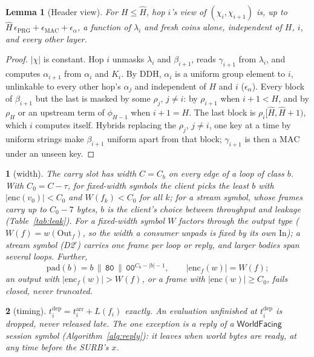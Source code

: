 \documentclass[journal]{IEEEtran}
\newtheorem{lemma}{Lemma}
\newcommand{\namedhead}{}
\newtheorem*{namedenv}{\namedhead}
\newenvironment{lawL}[2]{\renewcommand{\namedhead}{Law #1}%
  \begin{namedenv}[#2]}{\end{namedenv}}
\newcommand{\WF}{\mathsf{WorldFacing}}
\newcommand{\pad}{\mathrm{pad}}
\newcommand{\enc}{\mathrm{enc}}
\newcommand{\In}{\mathrm{In}}
\newcommand{\Out}{\mathrm{Out}}
\newcommand{\arr}{t^{\mathrm{arr}}}
\newcommand{\dep}{t^{\mathrm{dep}}}
\newcommand{\Hm}{\hat H}
\newcommand{\PRG}{\mathrm{PRG}}
\newcommand{\MAC}{\mathrm{MAC}}
\begin{document}
\begin{lemma}[Header view]\label{lem:header}
For $H\le\Hm$, hop $i$'s view of $(\chi_i,\chi_{i+1})$ is, up to
$\Hm\,\epsilon_{\PRG}+\epsilon_{\MAC}+\epsilon_{\alpha}$, a function of
$\lambda_i$ and fresh coins alone, independent of $H$, $i$, and every
other layer.
\end{lemma}
\begin{proof}
$|\chi|$ is constant.  Hop $i$ unmasks $\lambda_i$ and $\beta_{i+1}$,
reads $\gamma_{i+1}$ from $\lambda_i$, and computes $\alpha_{i+1}$ from
$\alpha_i$ and $K_i$.  By DDH, $\alpha_i$ is a uniform group element to $i$,
unlinkable to every other hop's $\alpha_j$ and independent of $H$ and $i$
($\epsilon_\alpha$).  Every block of
$\beta_{i+1}$ but the last is masked by some $\rho_j$, $j\ne i$: by
$\rho_{i+1}$ when $i+1<H$, and by $\rho_H$ or an upstream term of
$\phi_{H-1}$ when $i+1=H$.  The last block is $\rho_i[\Hm,\Hm{+}1)$,
which $i$ computes itself.  Hybrids replacing the $\rho_j$, $j\ne i$, one
key at a time by uniform strings make $\beta_{i+1}$ uniform apart from
that block; $\gamma_{i+1}$ is then a $\MAC$ under an unseen key.
\end{proof}

\begin{lawL}{L3}{width}
The carry slot has width $C=C_b$ on every edge of a loop of class $b$.
With $C_0=C-\tau$, for fixed-width symbols the client picks the least
$b$ with $|\enc(v_0)|<C_0$ and $W(f_k)<C_0$ for all $k$; for a stream
symbol, whose frames carry up to $C_0-7$ bytes, $b$ is the client's choice
between throughput and leakage (Table~\ref{tab:leak}).  For a fixed-width
symbol $W$ factors through the output type ($W(f)=w(\Out_f)$, so the
width a consumer unpads is fixed by its own $\In$); a stream symbol
(D2$'$) carries one frame per loop or reply, and larger bodies span
several loops.  Further,
\[
\pad(b)=b\,\|\,\mathtt{80}\,\|\,\mathtt{00}^{C_0-|b|-1},\qquad
|\enc_f(w)|=W(f);
\]
an output with $|\enc_f(w)|>W(f)$, or a frame with $|\enc(w)|\ge C_0$,
fails closed, never truncated.
\end{lawL}

\begin{lawL}{L4}{timing}
$\dep_i=\arr_i+L(f_i)$ exactly.  An evaluation unfinished at $\dep_i$ is
dropped, never released late.  The one exception is a reply of a $\WF$
session symbol (Algorithm~\ref{alg:reply}): it leaves when world bytes are
ready, at any time before the SURB's $x$.
\end{lawL}
\end{document}
